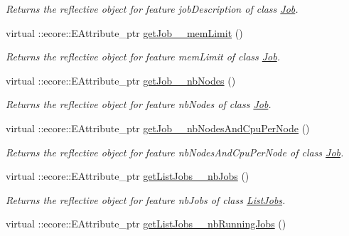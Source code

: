\begin{DoxyCompactItemize}
\begin{DoxyCompactList}\small\item\em Returns the reflective object for feature jobDescription of class \hyperlink{classTMS__Data_1_1Job}{Job}. \item\end{DoxyCompactList}\item 
virtual ::ecore::EAttribute\_\-ptr \hyperlink{classTMS__Data_1_1TMS__DataPackage_a76a59cfe21048e329a02f07a10708359}{getJob\_\-\_\-memLimit} ()
\begin{DoxyCompactList}\small\item\em Returns the reflective object for feature memLimit of class \hyperlink{classTMS__Data_1_1Job}{Job}. \item\end{DoxyCompactList}\item 
virtual ::ecore::EAttribute\_\-ptr \hyperlink{classTMS__Data_1_1TMS__DataPackage_a44d3b33c15cc037e296d321c4397fba2}{getJob\_\-\_\-nbNodes} ()
\begin{DoxyCompactList}\small\item\em Returns the reflective object for feature nbNodes of class \hyperlink{classTMS__Data_1_1Job}{Job}. \item\end{DoxyCompactList}\item 
virtual ::ecore::EAttribute\_\-ptr \hyperlink{classTMS__Data_1_1TMS__DataPackage_ad51b2af22cab665b2ffce2e69a25d6d1}{getJob\_\-\_\-nbNodesAndCpuPerNode} ()
\begin{DoxyCompactList}\small\item\em Returns the reflective object for feature nbNodesAndCpuPerNode of class \hyperlink{classTMS__Data_1_1Job}{Job}. \item\end{DoxyCompactList}\item 
virtual ::ecore::EAttribute\_\-ptr \hyperlink{classTMS__Data_1_1TMS__DataPackage_af81f2b522620d3f46cabe9a593c9208e}{getListJobs\_\-\_\-nbJobs} ()
\begin{DoxyCompactList}\small\item\em Returns the reflective object for feature nbJobs of class \hyperlink{classTMS__Data_1_1ListJobs}{ListJobs}. \item\end{DoxyCompactList}\item 
virtual ::ecore::EAttribute\_\-ptr \hyperlink{classTMS__Data_1_1TMS__DataPackage_acc5ca8eb27276580be6564f6dc3a6638}{getListJobs\_\-\_\-nbRunningJobs} ()

\end{DoxyCompactItemize}
